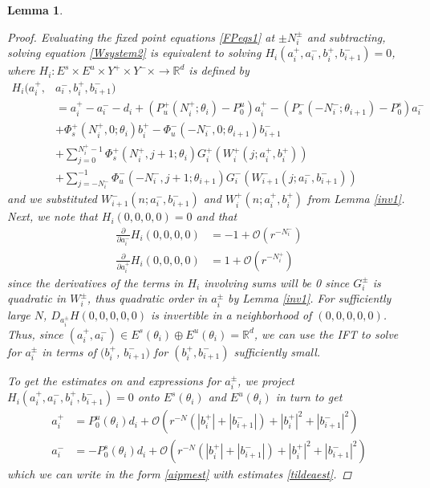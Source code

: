 \documentclass[12pt]{article}
\def\R{{\mathbb R}}
\newtheorem{lemma}{Lemma}
\begin{document}
\begin{lemma}
\begin{proof}
Evaluating the fixed point equations \eqref{FPeqs1} at $\pm N_i^\pm$ and subtracting, solving equation \eqref{Wsystem2} is equivalent to solving $H_i(a_i^+, a_i^-, b_i^+, b_{i+1}^-) = 0$, where $H_i: E^s \times E^u \times Y^+ \times Y^- \times \rightarrow \R^d$ is defined by
\begin{align*}
H_i(a_i^+, &a_i^-, b_i^+, b_{i+1}^-) \\
&= a_i^+ - a_i^- - d_i + (P_u^+(N_i^+; \theta_i) - P_0^u) a_i^+ - (P_s^-(-N_i^-; \theta_{i+1}) - P_0^s) a_i^- \\
&+ \Phi_s^+(N_i^+, 0; \theta_i) b_i^+ - \Phi_u^-(-N_i^-, 0; \theta_{i+1}) b_{i+1}^- \\
&+ \sum_{j = 0}^{N_i^+-1} \Phi_s^+(N_i^+, j+1; \theta_i) G_i^+(W_i^+(j; a_i^+, b_i^+)) \\
&+ \sum_{j = -N_i^-}^{-1} \Phi_u^-(-N_i^-, j+1; \theta_{i+1}) G_i^-(W_{i+1}^-(j; a_i^-, b_{i+1}^-))
\end{align*}
and we substituted $W_{i+1}^-(n; a_i^-, b_{i+1}^-)$ and $W_i^+(n; a_i^+, b_i^+)$ from Lemma \ref{inv1}. Next, we note that $H_i(0,0,0,0) = 0$ and that 
\begin{align*}
\frac{\partial}{\partial a_i^-} H_i(0, 0, 0, 0) &= -1 + \mathcal{O}(r^{-N_i^-}) \\
\frac{\partial}{\partial a_i^+} H_i(0, 0, 0, 0) &= 1 + \mathcal{O}(r^{-N_i^+})
\end{align*}
since the derivatives of the terms in $H_i$ involving sums will be 0 since $G_i^\pm$ is quadratic in $W_i^\pm$, thus quadratic order in $a_i^\pm$ by Lemma \ref{inv1}. For sufficiently large $N$, $D_{a_i^\pm} H(0, 0, 0, 0, 0)$ is invertible in a neighborhood of $(0, 0, 0, 0, 0)$. Thus, since $(a_i^+, a_i^-) \in E^s(\theta_i) \oplus E^u(\theta_i) = \R^d$, we can use the IFT to solve for $a_i^\pm$ in terms of $(b_i^+$, $b_{i+1}^-)$ for $(b_i^+, b_{i+1}^-)$ sufficiently small.

To get the estimates on and expressions for $a_i^\pm$, we project $H_i(a_i^+, a_i^-, b_i^+, b_{i+1}^-) = 0$ onto $E^s(\theta_i)$ and $E^u(\theta_i)$ in turn to get 
\begin{align*}
a_i^+ &= P_0^u(\theta_i) d_i + \mathcal{O}(r^{-N}(|b_i^+|+|b_{i+1}^-|) + |b_i^+|^2+|b_{i+1}^-|^2) \\
a_i^- &= -P_0^s(\theta_i) d_i + \mathcal{O}(r^{-N}(|b_i^+|+|b_{i+1}^-|) + |b_i^+|^2+|b_{i+1}^-|^2)
\end{align*}
which we can write in the form \eqref{aipmest} with estimates \eqref{tildeaest}. 


\end{proof}
\end{lemma}
\end{document}

